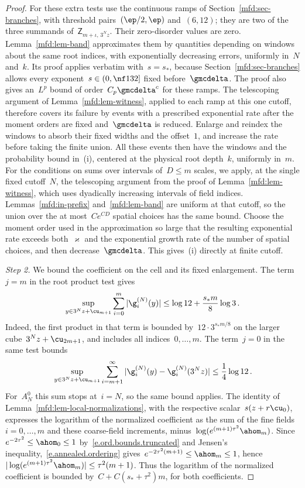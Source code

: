 \documentclass[11pt]{amsart}
\begin{document}
\begin{proof}
For these extra tests use the continuous ramps of Section~\ref{mfd:sec-branches}, with threshold pairs~$(\ep/2,\ep)$ and~$(6,12)$; they are two of the three summands of~$\mathsf Z_{m+\iota,\,3^Nz}$. Their zero-disorder values are zero. Lemma~\ref{mfd:lem-band} approximates them by quantities depending on windows about the same root indices, with exponentially decreasing errors, uniformly in~$N$ and~$k$. Its proof applies verbatim with~$s=s_*$, because Section~\ref{mfd:sec-branches} allows every exponent~$s\in(0,\nf1{32}]$ fixed before~$\gmcdelta$. The proof also gives an~$L^p$ bound of order~$C_p\gmcdelta^c$ for these ramps. The telescoping argument of Lemma~\ref{mfd:lem-witness}, applied to each ramp at this one cutoff, therefore covers its failure by events with a prescribed exponential rate after the moment orders are fixed and~$\gmcdelta$ is reduced. Enlarge and reindex the windows to absorb their fixed widths and the offset~$1$, and increase the rate before taking the finite union. All these events then have the windows and the probability bound in~(i), centered at the physical root depth~$k$, uniformly in~$m$. For the conditions on sums over intervals of~$D\leq m$ scales, we apply, at the single fixed cutoff~$N$, the telescoping argument from the proof of Lemma~\ref{mfd:lem-witness}, which uses dyadically increasing intervals of field indices. Lemmas~\ref{mfd:in-prefix} and~\ref{mfd:lem-band} are uniform at that cutoff, so the union over the at most~$Ce^{CD}$ spatial choices has the same bound. Choose the moment order used in the approximation so large that the resulting exponential rate exceeds both~$\varkappa$ and the exponential growth rate of the number of spatial choices, and then decrease~$\gmcdelta$. This gives~(i) directly at finite cutoff.

\smallskip

\emph{Step 2.} We bound the coefficient on the cell and its fixed enlargement. The term~$j=m$ in the root product test gives
\begin{equation*}
	\sup_{y\in 3^Nz+\cu_{m+1}}\sum_{i=0}^{m}|\g_i^{(N)}(y)|
	\leq\log12+\frac{s_* m}{8}\log3\,.
\end{equation*}
Indeed, the first product in that term is bounded by~$12\cdot3^{s_* m/8}$ on the larger cube~$3^Nz+\cu_{2m+1}$, and includes all indices~$0,\ldots,m$. The term~$j=0$ in the same test bounds
\begin{equation*}
	\sup_{y\in 3^Nz+\cu_{m+1}}
	\sum_{i=m+1}^{\infty}
	|\g_i^{(N)}(y)-\g_i^{(N)}(3^Nz)|
	\leq\frac14\log12\,.
\end{equation*}
For~$A_N^0$ this sum stops at~$i=N$, so the same bound applies. The identity of Lemma~\ref{mfd:lem-local-normalizations}, with the respective scalar~$s(z+r\cu_0)$, expresses the logarithm of the normalized coefficient as the sum of the fine fields~$i=0,\ldots,m$ and these coarse-field increments, minus~$\log(e^{(m+1)\tau^2}\ahom_m)$. Since~$e^{-2\tau^2}\leq\ahom_0\leq1$ by~\eqref{e.ord.bounds.truncated} and Jensen's inequality,~\eqref{e.annealed.ordering} gives~$e^{-2\tau^2(m+1)}\leq\ahom_m\leq1$, hence~$|\log(e^{(m+1)\tau^2}\ahom_m)|\leq\tau^2(m+1)$. Thus the logarithm of the normalized coefficient is bounded by~$C+C(s_*+\tau^2)m$, for both coefficients.


\end{proof}
\end{document}
